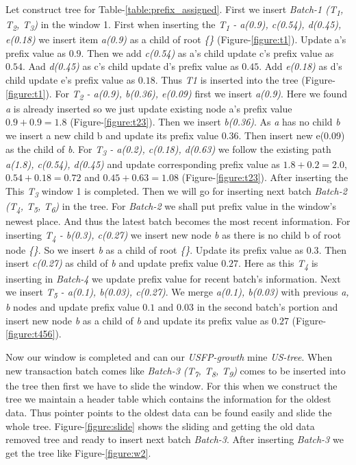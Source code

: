 \documentclass[conference]{IEEEtran}
\begin{document}
    Let construct tree for Table-\ref{table:prefix_assigned}. First we insert \emph{Batch-1 (T\textsubscript{1}, T\textsubscript{2}, T\textsubscript{3})} in the window 1. First when inserting the \emph{T\textsubscript{1} - a(0.9), c(0.54), d(0.45), e(0.18)} we insert item \emph{a(0.9)} as a child of root \emph{\{\}} (Figure-\ref{figure:t1}). Update a's prefix value as $0.9$. Then we add \emph{c(0.54)} as a's child update c's prefix value as $0.54$. Aad \emph{d(0.45)} as c's child update d's prefix value as $0.45$. Add \emph{e(0.18)} as d's child update e's prefix value as $0.18$. Thus \emph{T1} is inserted into the tree (Figure-\ref{figure:t1}). For \emph{T\textsubscript{2} - a(0.9), b(0.36), e(0.09)} first we insert \emph{a(0.9)}. Here we found \emph{a} is already inserted so we just update existing node a's prefix value $0.9 + 0.9 = 1.8$ (Figure-\ref{figure:t23}). Then we insert \emph{b(0.36)}. As \emph{a} has no child \emph{b} we insert a new child b and update its prefix value $0.36$. Then insert new e(0.09) as the child of \emph{b}. For \emph{T\textsubscript{3} - a(0.2), c(0.18), d(0.63)} we follow the existing path \emph{a(1.8), c(0.54), d(0.45)} and update corresponding prefix value as $1.8 + 0.2 = 2.0$, $0.54 + 0.18 = 0.72$ and $0.45 + 0.63 = 1.08$ (Figure-\ref{figure:t23}). After inserting the This \emph{T\textsubscript{3}} window 1 is completed. Then we will go for inserting next batch \emph{Batch-2 (T\textsubscript{4}, T\textsubscript{5}, T\textsubscript{6})} in the tree. For \emph{Batch-2} we shall put prefix value in the window's newest place. And thus the latest batch becomes the most recent information. For inserting \emph{T\textsubscript{4} - b(0.3), c(0.27)} we insert new node \emph{b} as there is no child b of root node \emph{\{\}}. So we insert \emph{b} as a child of root \emph{\{\}}. Update its prefix value as $0.3$. Then insert \emph{c(0.27)} as child of \emph{b} and update prefix value $0.27$. Here as this \emph{T\textsubscript{4}} is inserting in \emph{Batch-4} we update prefix value for recent batch's information. Next we insert \emph{T\textsubscript{5} - a(0.1), b(0.03), c(0.27)}. We merge \emph{a(0.1), b(0.03)} with previous \emph{a, b } nodes and update prefix value $0.1$ and $0.03$ in the second batch's portion and insert new node \emph{b} as a child of \emph{b} and update its prefix value as $0.27$ (Figure-\ref{figure:t456}).
    
    Now our window is completed and can our \emph{USFP-growth} mine \emph {US-tree}. When new transaction batch comes like \emph{Batch-3 (T\textsubscript{7}, T\textsubscript{8}, T\textsubscript{9})} comes to be inserted into the tree then first we have to slide the window. For this when we construct the tree we maintain a header table which contains the information for the oldest data. Thus pointer points to the oldest data can be found easily and slide the whole tree. Figure-\ref{figure:slide} shows the sliding and getting the old data removed tree and ready to insert next batch \emph{Batch-3}. After inserting \emph{Batch-3} we get the tree like Figure-\ref{figure:w2}. 
\end{document}
